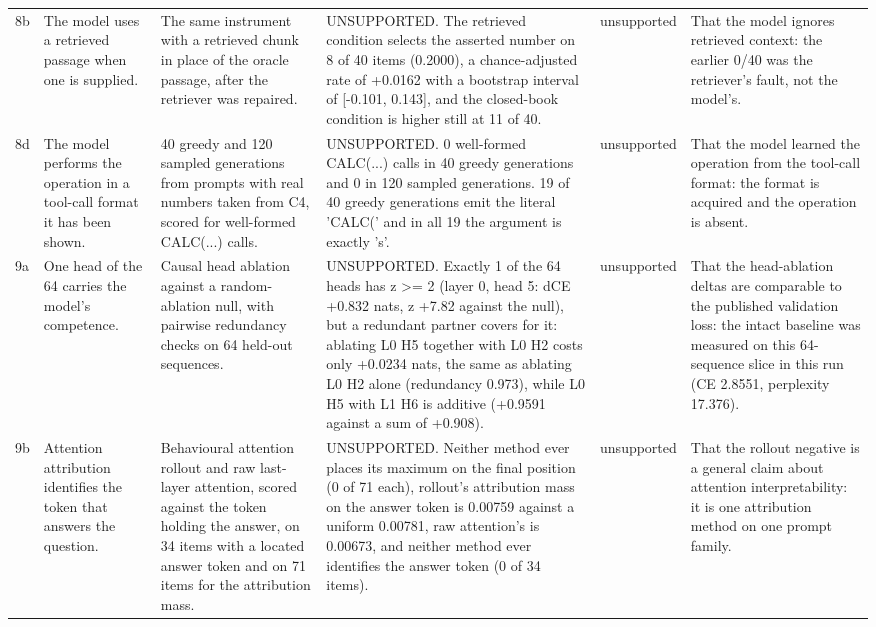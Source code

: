 {\begin{longtable}{L{0.9cm}L{2.8cm}L{2.7cm}L{3.0cm}L{1.9cm}L{2.1cm}}
8b & The model uses a retrieved passage when one is supplied. & The same instrument with a retrieved chunk in place of the oracle passage, after the retriever was repaired. & UNSUPPORTED. The retrieved condition selects the asserted number on 8 of 40 items (0.2000), a chance-adjusted rate of +0.0162 with a bootstrap interval of [-0.101, 0.143], and the closed-book condition is higher still at 11 of 40. & unsupported & That the model ignores retrieved context: the earlier 0/40 was the retriever's fault, not the model's. \\
8d & The model performs the operation in a tool-call format it has been shown. & 40 greedy and 120 sampled generations from prompts with real numbers taken from C4, scored for well-formed CALC(...) calls. & UNSUPPORTED. 0 well-formed CALC(...) calls in 40 greedy generations and 0 in 120 sampled generations. 19 of 40 greedy generations emit the literal 'CALC(' and in all 19 the argument is exactly 's'. & unsupported & That the model learned the operation from the tool-call format: the format is acquired and the operation is absent. \\
9a & One head of the 64 carries the model's competence. & Causal head ablation against a random-ablation null, with pairwise redundancy checks on 64 held-out sequences. & UNSUPPORTED. Exactly 1 of the 64 heads has z >= 2 (layer 0, head 5: dCE +0.832 nats, z +7.82 against the null), but a redundant partner covers for it: ablating L0 H5 together with L0 H2 costs only +0.0234 nats, the same as ablating L0 H2 alone (redundancy 0.973), while L0 H5 with L1 H6 is additive (+0.9591 against a sum of +0.908). & unsupported & That the head-ablation deltas are comparable to the published validation loss: the intact baseline was measured on this 64-sequence slice in this run (CE 2.8551, perplexity 17.376). \\
9b & Attention attribution identifies the token that answers the question. & Behavioural attention rollout and raw last-layer attention, scored against the token holding the answer, on 34 items with a located answer token and on 71 items for the attribution mass. & UNSUPPORTED. Neither method ever places its maximum on the final position (0 of 71 each), rollout's attribution mass on the answer token is 0.00759 against a uniform 0.00781, raw attention's is 0.00673, and neither method ever identifies the answer token (0 of 34 items). & unsupported & That the rollout negative is a general claim about attention interpretability: it is one attribution method on one prompt family. \\

\end{longtable}}
